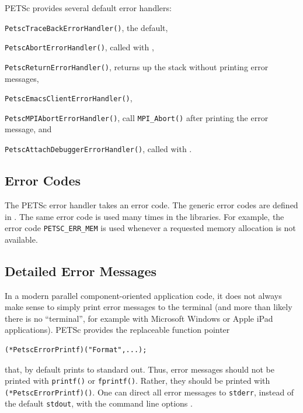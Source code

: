 PETSc provides several default error handlers:
\begin{tightitemize}
  \item \lstinline{PetscTraceBackErrorHandler()}, the default,
  \item \lstinline{PetscAbortErrorHandler()}, called with ,
  \item \lstinline{PetscReturnErrorHandler()}, returns up the stack without printing error messages,
  \item \lstinline{PetscEmacsClientErrorHandler()},
  \item \lstinline{PetscMPIAbortErrorHandler()}, call \lstinline{MPI_Abort()} after printing the error message, and
  \item \lstinline{PetscAttachDebuggerErrorHandler()}, called with .
\end{tightitemize}

\subsection{Error Codes}

The PETSc error handler takes an error code.
The generic error codes are defined in
\href{http://www.mcs.anl.gov/petsc/petsc-master/include/petscerror.h.html}{}.
The same error code is used many times in the libraries.
For example, the error code \lstinline{PETSC_ERR_MEM} is used whenever a requested memory allocation is not available.

\subsection{Detailed Error Messages}
In a modern parallel component-oriented application code, it does not always make sense
to simply print error messages to the terminal (and more than likely there is no
``terminal'', for example with Microsoft Windows or Apple iPad applications).
PETSc provides the replaceable function pointer
\begin{lstlisting}
(*PetscErrorPrintf)("Format",...);
\end{lstlisting}
that, by default prints to standard out. Thus, error messages should not
be printed with \lstinline{printf()} or \lstinline{fprintf()}.
Rather, they should be printed with
\lstinline{(*PetscErrorPrintf)()}.
One can direct all error messages to \lstinline{stderr}, instead of the default \lstinline{stdout}, with the command line options .

